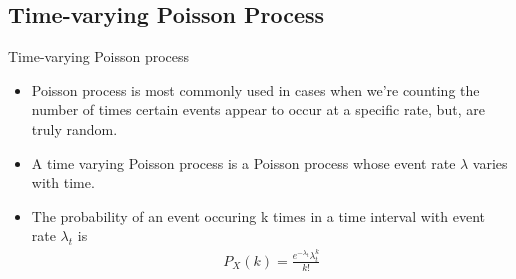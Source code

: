 \documentclass[10pt]{beamer}
\begin{document}
\subsection{Time-varying Poisson Process}
\begin{frame}{Time-varying Poisson process}
    \begin{itemize}
        \item Poisson process is most commonly used in cases when we're counting the number of times certain events appear to occur at a specific rate, but, are truly random.
        \item A time varying Poisson process is a Poisson process whose event rate $\lambda$ varies with time. 
        \item The probability of an event occuring k times in a time interval with event rate $\lambda_t$ is \begin{align}
            P_{X}(k)=\frac{e^{-\lambda_t}\lambda_t^{k}}{k!}
        \end{align}
    \end{itemize}
\end{frame}
\end{document}
